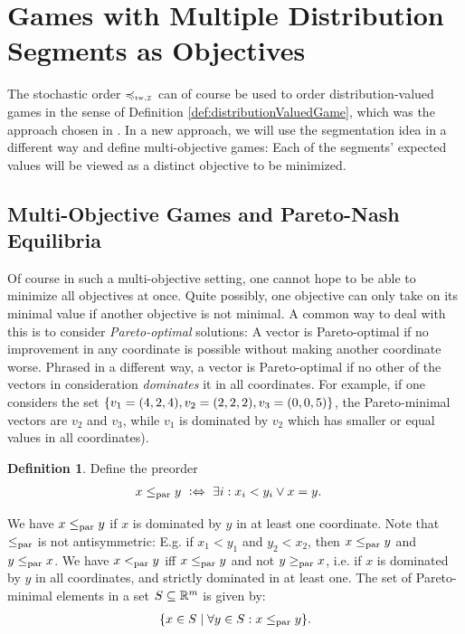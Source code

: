 \documentclass[a4paper,DIV=11,abstracton,twoside=semi]{scrreprt}
\theoremstyle{definition}
\newtheorem{defn}[thm]{Definition} %
\begin{document}
    \section{Games with Multiple Distribution Segments as Objectives}
    The stochastic order $\leqtw$ can of course be used to order distribution-valued games in the sense of Definition \ref{def:distributionValuedGame}, which was the approach chosen in \cite{bib:tweakableStochasticOrders}.
    In a new approach, we will use the segmentation idea in a different way and define multi-objective games: Each of the segments' expected values will be viewed as a distinct objective to be minimized.
    
    \subsection{Multi-Objective Games and Pareto-Nash Equilibria}
    Of course in such a multi-objective setting, one cannot hope to be able to minimize all objectives at once. Quite possibly, one objective can only take on its minimal value if another objective is not minimal. A common way to deal with this is to consider \emph{Pareto-optimal} solutions:
    A vector is Pareto-optimal if no improvement in any coordinate is possible without making another coordinate worse. Phrased in a different way, a vector is Pareto-optimal if no other of the vectors in consideration \emph{dominates} it in all coordinates.
    For example, if one considers the set $\{v_1 = (4, 2, 4), v_2 = (2, 2, 2), v_3 = (0, 0, 5)\}$, the Pareto-minimal vectors are $v_2$ and $v_3$, while $v_1$ is dominated by $v_2$ which has smaller or equal values in all coordinates).
    
    \begin{defn}
        Define the preorder
        \begin{align*}
        	x \leq_{\text{par}} y ~ & \mathrel{\vcentcolon\Leftrightarrow}~ \exists i: x_i < y_i \vee x = y.
        \end{align*}
    \end{defn}
    We have $x \leq_{\text{par}} y$ if $x$ is dominated by $y$ in at least one coordinate.
    Note that $\leq_{\text{par}}$ is not antisymmetric: E.g. if $x_1 < y_1$ and $y_2 < x_2$, then $x \leq_{\text{par}} y$ and $y \leq_{\text{par}} x$.
    We have $x <_{\text{par}} y$ iff $x \leq_{\text{par}} y$ and not $y \geq_{\text{par}} x$, i.e. if $x$ is dominated by $y$ in all coordinates, and strictly dominated in at least one.
    The set of Pareto-minimal elements in a set $S \subseteq \mathbb{R}^m$ is given by:
    \begin{gather*}
        \{x \in S \mid \forall y \in S: x \leq_{\text{par}} y\}.
    \end{gather*}    
    
\end{document}
